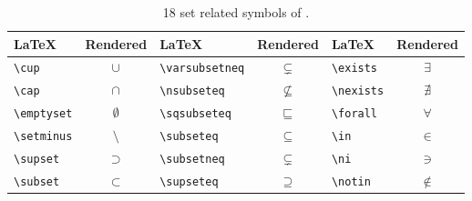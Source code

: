 \begin{table}[ht]
        \centering

            \begin{tabular}{lc|lc|lc}
                \toprule
                \LaTeX & Rendered & \LaTeX & Rendered & \LaTeX & Rendered \\
                \midrule
\verb+\cup+ & $\cup$ &\verb+\varsubsetneq+ & $\varsubsetneq$ &\verb+\exists+ & $\exists$\\
\verb+\cap+ & $\cap$ &\verb+\nsubseteq+ & $\nsubseteq$ &\verb+\nexists+ & $\nexists$\\
\verb+\emptyset+ & $\emptyset$ &\verb+\sqsubseteq+ & $\sqsubseteq$ &\verb+\forall+ & $\forall$\\
\verb+\setminus+ & $\setminus$ &\verb+\subseteq+ & $\subseteq$ &\verb+\in+ & $\in$\\
\verb+\supset+ & $\supset$ &\verb+\subsetneq+ & $\subsetneq$ &\verb+\ni+ & $\ni$\\
\verb+\subset+ & $\subset$ &\verb+\supseteq+ & $\supseteq$ &\verb+\notin+ & $\notin$\\

        \bottomrule
    \end{tabular}

    \caption{18 set related symbols of \dbName.}
    \label{table:symbols-of-db-8}
\end{table}
\clearpage